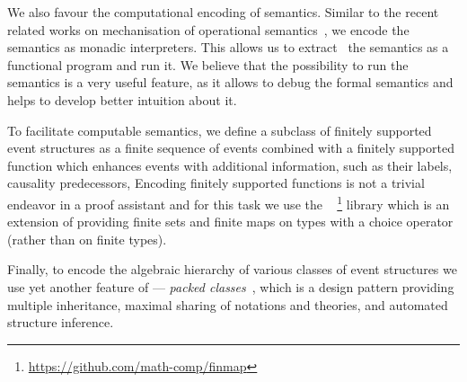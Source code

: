We also favour the computational encoding of semantics. 
Similar to the recent related works on mechanisation 
of operational semantics~\cite{Xia-al:POPL2019, Letan-al:CPP2020, Affeldt-al:ICMPC2019}, 
we encode the semantics as monadic interpreters.  
This allows us to extract~\cite{Letouzey:CCE2008} 
the semantics as a functional program and run it. 
We believe that the possibility to run the semantics 
is a very useful feature, as it allows 
to debug the formal semantics
and helps to develop better intuition about it.

To facilitate computable semantics, we define a subclass of
finitely supported event structures as a finite sequence of events
combined with a finitely supported function which enhances events with 
additional information, such as their labels, causality predecessors, \etc 
Encoding finitely supported functions is not a trivial endeavor in
a proof assistant and for this task we use the \finmap~%
\footnote{\url{https://github.com/math-comp/finmap}}
library which is an extension of \mathcomp providing finite sets and
finite maps on types with a choice operator (rather than on finite types).

Finally, to encode the algebraic hierarchy of various classes of event structures
we use yet another feature of \mathcomp --- 
\emph{packed classes}~\cite{Garillot-al:ICTPHOL2009},
which is a design pattern providing multiple inheritance,
maximal sharing of notations and theories,
and automated structure inference. %

